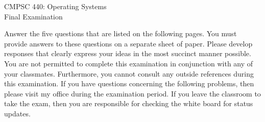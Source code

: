 \documentclass[12pt,epsf,psfig,graphics]{article}
\def\widow#1{\vskip #1\vbadness10000\penalty-200\vskip-#1}
\begin{document}

\def\widow#1{\vskip #1\vbadness10000\penalty-200\vskip-#1}

\begin{center}

CMPSC 440: Operating Systems\\
Final Examination \\

\end{center}

\noindent
Answer the five questions that are listed on the following pages.  You must provide answers to these questions on a
separate sheet of paper.  Please develop responses that clearly express your ideas in the most succinct manner possible.
You are not permitted to complete this examination in conjunction with any of your classmates.  Furthermore, you cannot
consult any outside references during this examination.  If you have questions concerning the following problems, then
please visit my office during the examination period.  If you leave the classroom to take the exam, then you are
responsible for checking the white board for status updates.

\end{document}
